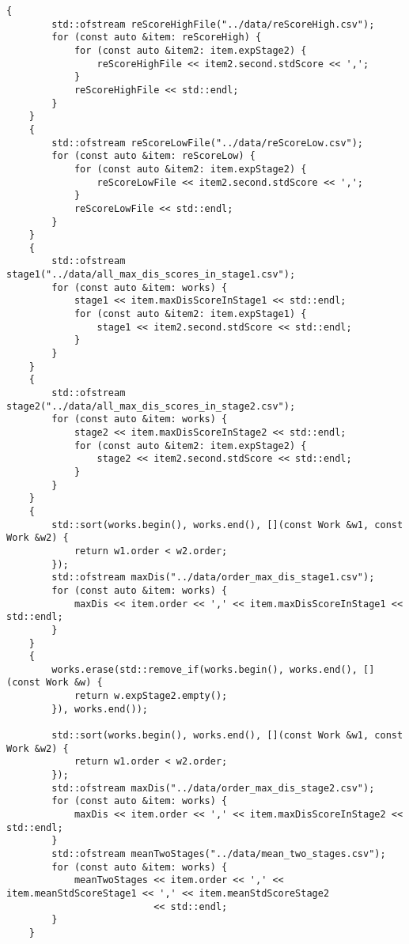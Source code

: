 \documentclass[bwprint]{gmcmthesis}
\begin{document}
\begin{lstlisting}[label=问题3,caption={问题3代码}]
    {
        std::ofstream reScoreHighFile("../data/reScoreHigh.csv");
        for (const auto &item: reScoreHigh) {
            for (const auto &item2: item.expStage2) {
                reScoreHighFile << item2.second.stdScore << ',';
            }
            reScoreHighFile << std::endl;
        }
    }
    {
        std::ofstream reScoreLowFile("../data/reScoreLow.csv");
        for (const auto &item: reScoreLow) {
            for (const auto &item2: item.expStage2) {
                reScoreLowFile << item2.second.stdScore << ',';
            }
            reScoreLowFile << std::endl;
        }
    }
    {
        std::ofstream stage1("../data/all_max_dis_scores_in_stage1.csv");
        for (const auto &item: works) {
            stage1 << item.maxDisScoreInStage1 << std::endl;
            for (const auto &item2: item.expStage1) {
                stage1 << item2.second.stdScore << std::endl;
            }
        }
    }
    {
        std::ofstream stage2("../data/all_max_dis_scores_in_stage2.csv");
        for (const auto &item: works) {
            stage2 << item.maxDisScoreInStage2 << std::endl;
            for (const auto &item2: item.expStage2) {
                stage2 << item2.second.stdScore << std::endl;
            }
        }
    }
    {
        std::sort(works.begin(), works.end(), [](const Work &w1, const Work &w2) {
            return w1.order < w2.order;
        });
        std::ofstream maxDis("../data/order_max_dis_stage1.csv");
        for (const auto &item: works) {
            maxDis << item.order << ',' << item.maxDisScoreInStage1 << std::endl;
        }
    }
    {
        works.erase(std::remove_if(works.begin(), works.end(), [](const Work &w) {
            return w.expStage2.empty();
        }), works.end());

        std::sort(works.begin(), works.end(), [](const Work &w1, const Work &w2) {
            return w1.order < w2.order;
        });
        std::ofstream maxDis("../data/order_max_dis_stage2.csv");
        for (const auto &item: works) {
            maxDis << item.order << ',' << item.maxDisScoreInStage2 << std::endl;
        }
        std::ofstream meanTwoStages("../data/mean_two_stages.csv");
        for (const auto &item: works) {
            meanTwoStages << item.order << ',' << item.meanStdScoreStage1 << ',' << item.meanStdScoreStage2
                          << std::endl;
        }
    }
\end{lstlisting}
\end{document}
